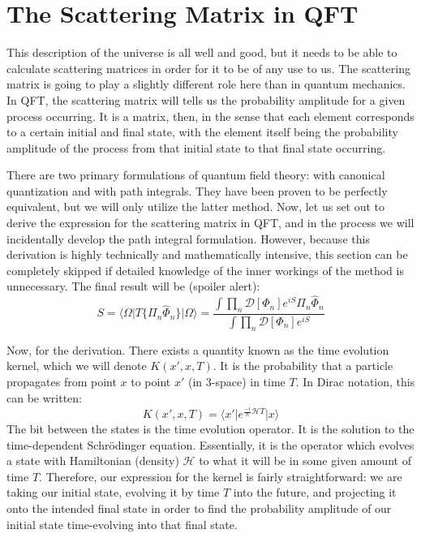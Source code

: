 \documentclass{report}
\begin{document}
\section{The Scattering Matrix in QFT}
This description of the universe is all well and good, but it needs to be able to calculate scattering matrices in order for it to be of any use to us. The scattering matrix is going to play a slightly different role here than in quantum mechanics. In QFT, the scattering matrix will tells us the probability amplitude for a given process occurring. It is a matrix, then, in the sense that each element corresponds to a certain initial and final state, with the element itself being the probability amplitude of the process from that initial state to that final state occurring.

There are two primary formulations of quantum field theory: with canonical quantization and with path integrals. They have been proven to be perfectly equivalent, but we will only utilize the latter method. Now, let us set out to derive the expression for the scattering matrix in QFT, and in the process we will incidentally develop the path integral formulation. However, because this derivation is highly technically and mathematically intensive, this section can be completely skipped if detailed knowledge of the inner workings of the method is unnecessary. The final result will be (spoiler alert):
\[
S = \langle \Omega \vert T \{\Pi_n \hat{\Phi}_n\} \vert \Omega \rangle = \frac{\int \prod_n \mathcal{D}[\Phi_n] e^{iS}\Pi_n \hat{\Phi}_n}{\int \prod_n \mathcal{D}[\Phi_n] e^{iS}}
\]

Now, for the derivation. There exists a quantity known as the time evolution kernel, which we will denote $K(x',x,T)$. It is the probability that a particle propagates from point $x$ to point $x'$ (in 3-space) in time $T$. In Dirac notation, this can be written:
\[
K(x', x, T) = \langle x' \vert e^{\frac{-i}{\hbar}\mathcal{H}T} \vert x \rangle
\]
The bit between the states is the time evolution operator. It is the solution to the time-dependent Schrödinger equation. Essentially, it is the operator which evolves a state with Hamiltonian (density) $\mathcal{H}$ to what it will be in some given amount of time $T$. Therefore, our expression for the kernel is fairly straightforward: we are taking our initial state, evolving it by time $T$ into the future, and projecting it onto the intended final state in order to find the probability amplitude of our initial state time-evolving into that final state.
\end{document}

